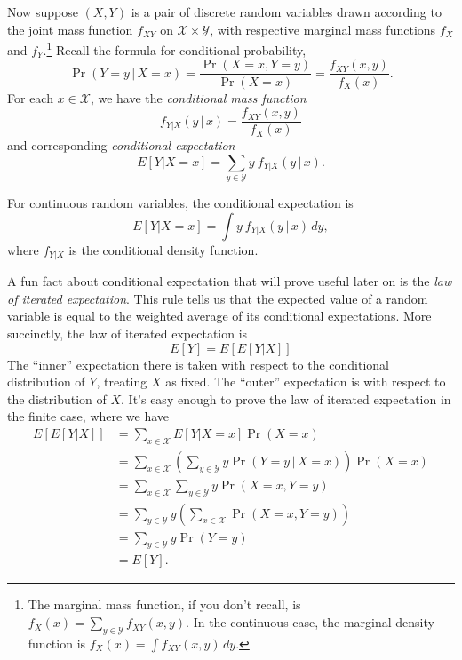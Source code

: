 \documentclass[
  12pt,
  oneside,openany]{book}
\begin{document}
Now suppose \((X, Y)\) is a pair of discrete random variables drawn according to the joint mass function \(f_{XY}\) on \(\mathcal{X} \times \mathcal{Y}\), with respective marginal mass functions \(f_X\) and \(f_Y\).\footnote{The marginal mass function, if you don't recall, is \(f_X(x) = \sum_{y \in \mathcal{Y}} f_{XY} (x, y)\). In the continuous case, the marginal density function is \(f_X(x) = \int f_{XY} (x, y) \, dy\).} Recall the formula for conditional probability,
\begin{equation}
\Pr(Y = y \,|\, X = x)
= \frac{\Pr(X = x, Y = y)}{\Pr(X = x)}
= \frac{f_{XY}(x, y)}{f_X(x)}.
\end{equation}
For each \(x \in \mathcal{X}\), we have the \emph{conditional mass function}
\begin{equation}
f_{Y|X}(y \,|\, x) = \frac{f_{XY}(x, y)}{f_X(x)}
\end{equation}
and corresponding \emph{conditional expectation}
\begin{equation}
E[Y | X = x]
= \sum_{y \in \mathcal{Y}} y \: f_{Y|X}(y \,|\, x).
\end{equation}

For continuous random variables, the conditional expectation is
\begin{equation}
E[Y | X = x]
= \int y \: f_{Y|X} (y \,|\, x) \, dy,
\end{equation}
where \(f_{Y|X}\) is the conditional density function.

A fun fact about conditional expectation that will prove useful later on is the \emph{law of iterated expectation}.
This rule tells us that the expected value of a random variable is equal to the weighted average of its conditional expectations.
More succinctly, the law of iterated expectation is
\[
E[Y] = E[ E[Y | X] ]
\]
The ``inner'' expectation there is taken with respect to the conditional distribution of \(Y\), treating \(X\) as fixed.
The ``outer'' expectation is with respect to the distribution of \(X\).
It's easy enough to prove the law of iterated expectation in the finite case, where we have
\[
\begin{aligned}
E[ E[Y | X] ]
&= \sum_{x \in \mathcal{X}} E[Y | X = x] \Pr(X = x) \\
&= \sum_{x \in \mathcal{X}} \left( \sum_{y \in \mathcal{Y}} y \Pr(Y = y \,|\, X = x) \right) \Pr(X = x) \\
&= \sum_{x \in \mathcal{X}} \sum_{y \in \mathcal{Y}} y \Pr(X = x, Y = y) \\
&= \sum_{y \in \mathcal{Y}} y \left( \sum_{x \in \mathcal{X}} \Pr(X = x, Y = y) \right) \\
&= \sum_{y \in \mathcal{Y}} y \Pr(Y = y) \\
&= E[Y].
\end{aligned}
\]
\end{document}
